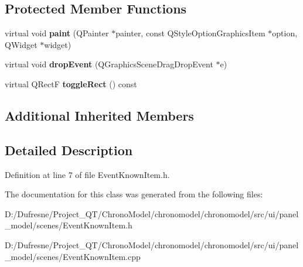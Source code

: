 \subsection*{Protected Member Functions}
\begin{DoxyCompactItemize}
\item 
\hypertarget{class_event_known_item_a61e35dc3bdfabdd43ee65757ac1d8931}{virtual void {\bfseries paint} (Q\-Painter $\ast$painter, const Q\-Style\-Option\-Graphics\-Item $\ast$option, Q\-Widget $\ast$widget)}\label{class_event_known_item_a61e35dc3bdfabdd43ee65757ac1d8931}

\item 
\hypertarget{class_event_known_item_a98c255118f098398444ad1036134ce16}{virtual void {\bfseries drop\-Event} (Q\-Graphics\-Scene\-Drag\-Drop\-Event $\ast$e)}\label{class_event_known_item_a98c255118f098398444ad1036134ce16}

\item 
\hypertarget{class_event_known_item_a4ac2478e99f0c478373d84f6eb50f382}{virtual Q\-Rect\-F {\bfseries toggle\-Rect} () const }\label{class_event_known_item_a4ac2478e99f0c478373d84f6eb50f382}

\end{DoxyCompactItemize}
\subsection*{Additional Inherited Members}


\subsection{Detailed Description}


Definition at line 7 of file Event\-Known\-Item.\-h.



The documentation for this class was generated from the following files\-:\begin{DoxyCompactItemize}
\item 
D\-:/\-Dufresne/\-Project\-\_\-\-Q\-T/\-Chrono\-Model/chronomodel/chronomodel/src/ui/panel\-\_\-model/scenes/Event\-Known\-Item.\-h\item 
D\-:/\-Dufresne/\-Project\-\_\-\-Q\-T/\-Chrono\-Model/chronomodel/chronomodel/src/ui/panel\-\_\-model/scenes/Event\-Known\-Item.\-cpp\end{DoxyCompactItemize}
